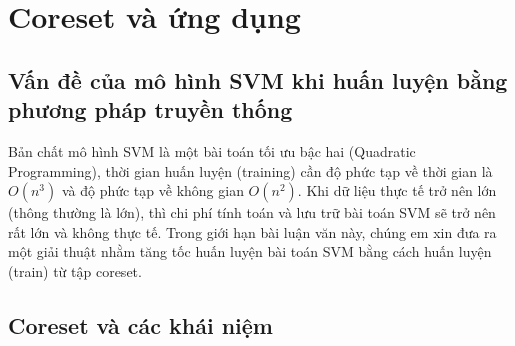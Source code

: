 \documentclass[a4paper, 12pt, oneside]{report}
\begin{document}
\chapter{Coreset và ứng dụng}
\section{Vấn đề của mô hình SVM khi huấn luyện bằng phương pháp truyền thống}
Bản chất mô hình SVM là một bài toán tối ưu bậc hai (Quadratic Programming), thời gian huấn luyện (training) cần độ phức tạp về thời gian là $O(n^3)$ và độ phức tạp về không gian $O(n^2)$. Khi dữ liệu thực tế trở nên lớn (thông thường là lớn), thì chi phí tính toán và lưu trữ bài toán SVM sẽ trở nên rất lớn và không thực tế. Trong giới hạn bài luận văn này, chúng em xin đưa ra một giải thuật nhằm tăng tốc huấn luyện bài toán SVM bằng cách huấn luyện (train) từ tập coreset.
\section{Coreset và các khái niệm }
\end{document}
